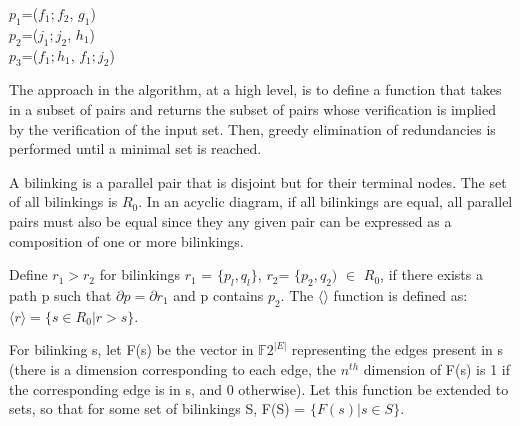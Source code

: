 \documentclass{article}
\begin{document}
\begin{center}

$p_1$=($f_1;f_2$, $g_1$)\\
$p_2$=($j_1;j_2$, $h_1$)\\
$p_3$=($f_1;h_1$, $f_1;j_2$)
\end{center}


The approach in the algorithm, at a high level, is to define a function that takes in a subset of pairs and returns the subset of pairs whose verification is implied by the verification of the input set. Then, greedy elimination of redundancies is performed until a minimal set is reached.

A bilinking is a parallel pair that is disjoint but for their terminal nodes. The set of all bilinkings is $R_0$.
In an acyclic diagram, if all bilinkings are equal, all parallel pairs must also be equal since they any given pair can be expressed as a composition of one or more bilinkings.

Define $r_1>r_2$ for bilinkings $r_1$ = $\{p_l,q_l\}$, $r_2$= $\{p_2, q_2)$ $\in$ $R_0$, if there exists a path p such that $\partial p=\partial r_1$ and p contains $p_2$.
The $\langle\rangle$ function is defined as:
$\langle r \rangle = \{ s\in R_0| r>s\}$.

For bilinking s, let F(s) be the vector in $\mathbb{F}2^{|E|}$ representing the edges present in s (there is a dimension corresponding to each edge, the $n^{th}$ dimension of F(s) is 1 if the corresponding edge is in s, and 0 otherwise). Let this function be extended to sets, so that for some set of bilinkings S, F(S) = $\{ F(s) | s\in S \}$.
\end{document}
